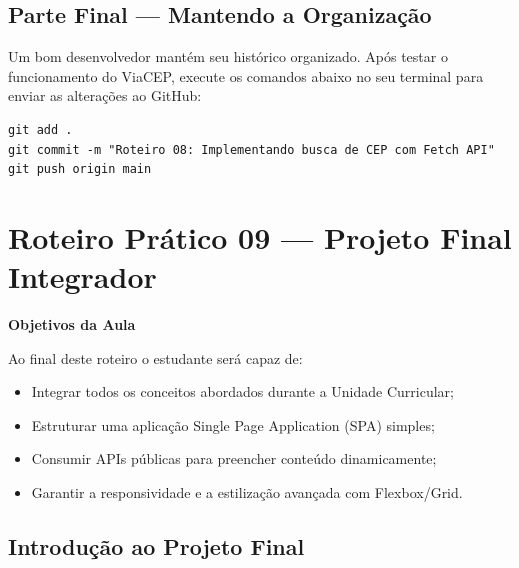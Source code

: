\documentclass[12pt,a4paper]{article}
\begin{document}
\subsection{Parte Final — Mantendo a Organização}

\begin{boxAtividade}
Um bom desenvolvedor mantém seu histórico organizado. Após testar o funcionamento do ViaCEP, execute os comandos abaixo no seu terminal para enviar as alterações ao GitHub:

\begin{boxCodigo}
\begin{verbatim}
git add .
git commit -m "Roteiro 08: Implementando busca de CEP com Fetch API"
git push origin main
\end{verbatim}
\end{boxCodigo}
\end{boxAtividade}

\newpage


\section{Roteiro Prático 09 — Projeto Final Integrador}


\begin{boxObjetivos}
\textbf{Objetivos da Aula}

Ao final deste roteiro o estudante será capaz de:

\begin{itemize}
\item Integrar todos os conceitos abordados durante a Unidade Curricular;
\item Estruturar uma aplicação Single Page Application (SPA) simples;
\item Consumir APIs públicas para preencher conteúdo dinamicamente;
\item Garantir a responsividade e a estilização avançada com Flexbox/Grid.
\end{itemize}
\end{boxObjetivos}

\subsection{Introdução ao Projeto Final}
\end{document}
